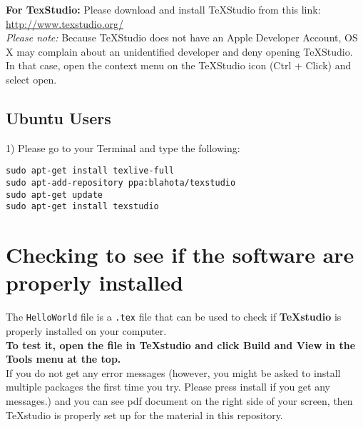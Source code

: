 \documentclass[]{article}
\begin{document}
\textbf{For TexStudio:}
Please download and install TeXStudio from this link: \url{http://www.texstudio.org/} \\

\textit{Please note:} Because TeXStudio does not have an Apple Developer Account, OS X may complain about an unidentified developer and deny opening TeXStudio. In that case, open the context menu on the TeXStudio icon (Ctrl + Click) and select open.

\subsection*{Ubuntu Users}

1) Please go to your Terminal and type the following:
\begin{verbatim}
sudo apt-get install texlive-full
sudo apt-add-repository ppa:blahota/texstudio 
sudo apt-get update 
sudo apt-get install texstudio
\end{verbatim}


\section*{Checking to see if the software are properly installed}

The \texttt{HelloWorld} file is a \texttt{.tex} file that can be used to check if \textbf{TeXstudio} is properly installed on your computer. \\

\textbf{To test it, open the file in TeXstudio and click Build and View in the Tools menu at the top. } \\

If you do not get any error messages (however, you might be asked to install multiple packages the first time you try. Please press install if you get any messages.) and you can see pdf document on the right side of your screen,  then TeXstudio is properly set up for the material in this repository. 
\end{document}
